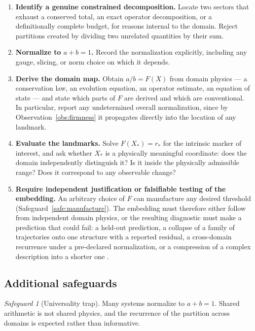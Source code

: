 \documentclass[11pt,a4paper]{article}
\theoremstyle{definition}
\theoremstyle{plain}
\theoremstyle{remark}
\newtheorem{safeguard}[definition]{Safeguard}
\begin{document}
\begin{enumerate}[label=\textbf{Step \arabic*.},leftmargin=*,itemsep=4pt]
\item \textbf{Identify a genuine constrained decomposition.} Locate two
sectors that exhaust a conserved total, an exact operator decomposition, or a
definitionally complete budget, for reasons internal to the domain. Reject
partitions created by dividing two unrelated quantities by their sum.

\item \textbf{Normalize to $a+b=1$.} Record the normalization explicitly,
including any gauge, slicing, or norm choice on which it depends.

\item \textbf{Derive the domain map.} Obtain $a/b=F(X)$ from domain physics ---
a conservation law, an evolution equation, an operator estimate, an equation of
state --- and state which parts of $F$ are derived and which are conventional.
In particular, report any undetermined overall normalization, since by
Observation~\ref{obs:firmness} it propagates directly into the location of any
landmark.

\item \textbf{Evaluate the landmarks.} Solve $F(X_{*})=r_{*}$ for the intrinsic
marker of interest, and ask whether $X_{*}$ is a physically meaningful
coordinate: does the domain independently distinguish it? Is it inside the
physically admissible range? Does it correspond to any observable change?

\item \textbf{Require independent justification or falsifiable testing of the
embedding.} An arbitrary choice of $F$ can manufacture any desired threshold
(Safeguard~\ref{safe:manufacture}). The embedding must therefore either follow
from independent domain physics, or the resulting diagnostic must make a
prediction that could fail: a held-out prediction, a collapse of a family of
trajectories onto one structure with a reported residual, a cross-domain
recurrence under a pre-declared normalization, or a compression of a complex
description into a shorter one \cite{EffPot}.
\end{enumerate}

\subsection{Additional safeguards}

\begin{safeguard}[Universality trap]
Many systems normalize to $a+b=1$. Shared arithmetic is not shared physics, and
the recurrence of the partition across domains is expected rather than
informative.
\end{safeguard}
\end{document}
